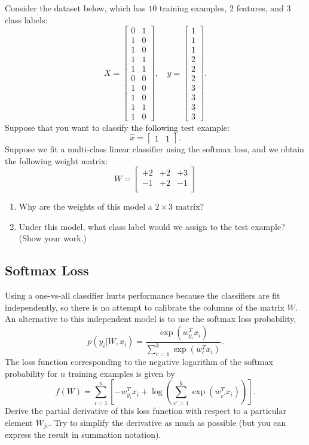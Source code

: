 \documentclass{article}
\def\blu#1{{\color{blu}#1}}
\def\enum#1{\begin{enumerate}#1\end{enumerate}}
\begin{document}
Consider the dataset below, which has $10$ training examples, $2$ features, and $3$ class labels:
\[
X = \begin{bmatrix}0 & 1\\1 & 0\\ 1 & 0\\ 1 & 1\\ 1 & 1\\ 0 & 0\\  1 & 0\\  1 & 0\\  1 & 1\\  1 &0\end{bmatrix}, \quad y = \begin{bmatrix}1\\1\\1\\2\\2\\2\\3\\3\\3\\3\end{bmatrix}.
\]
Suppose that you want to classify the following test example:
\[
\hat{x} = \begin{bmatrix}1 & 1\end{bmatrix}.
\]
Suppose we fit a multi-class linear classifier using the softmax loss, and we obtain the following weight matrix:
\[
W = 
\begin{bmatrix}
+2 & +2 & +3\\
-1 & +2 & -1\\
\end{bmatrix}
\]
\blu{
\enum{
\item Why are the weights of this model a $2 \times 3$ matrix?
\item Under this model, what class label would we assign to the test example? (Show your work.)
}}





\subsection{Softmax Loss}

Using a one-vs-all classifier hurts performance because the classifiers are fit independently, so there is no attempt to calibrate the columns of the matrix $W$. An alternative to this independent model is to use the softmax loss probability,
\[
p(y_i | W, x_i) = \frac{\exp(w_{y_i}^Tx_i)}{\sum_{c=1}^k\exp(w_c^Tx_i)}.
\]
The loss function corresponding to the negative logarithm of the softmax probability for $n$ training examples is given by
\[
f(W) = \sum_{i=1}^n \left[-w_{y_i}^Tx_i + \log\left(\sum_{c' = 1}^k \exp(w_{c'}^Tx_i)\right)\right].
\]
\blu{Derive the partial derivative of this loss function with respect to a particular element $W_{jc}$}. Try to simplify the derivative as much as possible (but you can express the result in summation notation).
\end{document}
